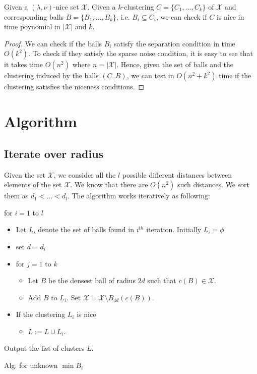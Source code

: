 \documentclass[11pt]{article}
\newenvironment{alg}{
    \begin{list}{}{
        \setlength{\itemsep}{2pt}
        \setlength{\parsep}{0pt}
        \setlength{\parskip}{0pt}
        \setlength{\topsep}{1pt}
    }
}
{
    \end{list}
}
\begin{document}
\begin{lemma}
\label{lemma:chknice}
Given a $(\lambda,\nu)$-nice set $\mathcal{X}$. Given a $k$-clustering $C = \{C_1,\ldots,C_k\}$ of $\mathcal{X}$ and corresponding balls $B = \{B_1,\ldots,B_k\}$, i.e. $B_i \subseteq C_i$, we can check if $C$ is nice in time poynomial in $|\mathcal{X}|$ and $k$.
\end{lemma}
\begin{proof}
We can check if the balls $B_i$ satisfy the separation condition in time $O(k^2)$. To check if they satisfy the sparse noise condition, it is easy to see that it takes time $O(n^2)$ where $n = |\mathcal{X}|$. Hence, given the set of balls and the clustering induced by the balls $(C,B)$, we can test in $O(n^2+k^2)$ time if the clustering satisfies the niceness conditions.
\end{proof}

\section{Algorithm}

\subsection{Iterate over radius}

Given the set $\mathcal{X}$,
we consider all the $l$ possible different distances between elements of the set $\mathcal{X}$. We know that there are $O(n^2)$ such distances. We sort them as $d_1<\ldots<d_l$. The algorithm works iteratively as following:


\begin{algorithm}
\begin{alg}
\item[] for $i=1$ to $l$
\begin{itemize}
	\item[] Let $L_i$ denote the set of balls found in $i^{th}$ iteration. Initially $L_i=\phi$
	\item[] set $d=d_i$
	\item[] for $j=1$ to $k$
	\begin{itemize}
		\item[] Let $B$ be the densest ball of radius $2d$ such that $c(B) \in \mathcal{X}$.
		\item[] Add $B$ to $L_i$. Set $\mathcal{X}=\mathcal{X}\setminus B_{4d}(c(B))$. 
	\end{itemize}
	\item[] If the clustering $L_i$ is nice
	\begin{itemize}
		\item[] $L := L \cup L_i$.
	\end{itemize}
\end{itemize}
Output the list of clusters $L$.
\label{alg:NotKnown}
\end{alg}
\caption{Alg. for unknown $\min{B_i}$}
\end{algorithm}
\end{document}
